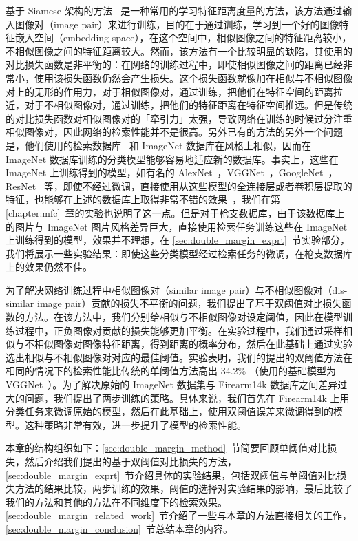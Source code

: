 基于 Siamese 架构的方法~\cite{Radenovic2016CNNIR,Chopra2005LearningAS,Bell2015LearningVS} 是一种常用的学习特征距离度量的方法，该方法通过输入图像对（image pair）来进行训练，目的在于通过训练，学习到一个好的图像特征嵌入空间（embedding space），在这个空间中，相似图像之间的特征距离较小，不相似图像之间的特征距离较大。然而，该方法有一个比较明显的缺陷，其使用的对比损失函数是非平衡的：在网络的训练过程中，即使相似图像之间的距离已经非常小，使用该损失函数仍然会产生损失。这个损失函数就像加在相似与不相似图像对上的无形的作用力，对于相似图像对，通过训练，把他们在特征空间的距离拉近，对于不相似图像对，通过训练，把他们的特征距离在特征空间推远。但是传统的对比损失函数对相似图像对的「牵引力」太强，导致网络在训练的时候过分注重相似图像对，因此网络的检索性能并不是很高。另外已有的方法的另外一个问题是，他们使用的检索数据库~\cite{Philbin2007ObjectRW,Philbin2008LostIQ} 和 ImageNet 数据库在风格上相似，因而在 ImageNet 数据库训练的分类模型能够容易地适应新的数据库。事实上，这些在 ImageNet 上训练得到的模型，如有名的 AlexNet~\cite{Krizhevsky2012ImageNetCW}，VGGNet~\cite{Simonyan2014VeryDC}，GoogleNet~\cite{Szegedy2015GoingDW}，ResNet~\cite{He2016DeepRL} 等，即使不经过微调，直接使用从这些模型的全连接层或者卷积层提取的特征，也能够在上述的数据库上取得非常不错的效果~\cite{Babenko2014NeuralCF,Babenko2015AggregatingLD,Tolias2015ParticularOR}，我们在第 \ref{chapter:mfc}~章的实验也说明了这一点。但是对于枪支数据库，由于该数据库上的图片与 ImageNet 图片风格差异巨大，直接使用检索任务训练这些在 ImageNet 上训练得到的模型，效果并不理想，在 \ref{sec:double_margin_exprt}~节实验部分，我们将展示一些实验结果：即使这些分类模型经过检索任务的微调，在枪支数据库上的效果仍然不佳。

为了解决网络训练过程中相似图像对（similar image pair）与不相似图像对（dis-similar image pair）贡献的损失不平衡的问题，我们提出了基于双阈值对比损失函数的方法。在该方法中，我们分别给相似与不相似图像对设定阈值，因此在模型训练过程中，正负图像对贡献的损失能够更加平衡。在实验过程中，我们通过采样相似与不相似图像对图像特征距离，得到距离的概率分布，然后在此基础上通过实验选出相似与不相似图像对对应的最佳阈值。实验表明，我们的提出的双阈值方法在相同的情况下的检索性能比传统的单阈值方法高出 34.2\% （使用的基础模型为 VGGNet~\cite{Simonyan2014VeryDC}）。为了解决原始的 ImageNet 数据集与 Firearm14k 数据库之间差异过大的问题，我们提出了两步训练的策略。具体来说，我们首先在 Firearm14k 上用分类任务来微调原始的模型，然后在此基础上，使用双阈值误差来微调得到的模型。这种策略非常有效，进一步提升了模型的检索性能。

本章的结构组织如下：\ref{sec:double_margin_method}~节简要回顾单阈值对比损失，然后介绍我们提出的基于双阈值对比损失的方法，\ref{sec:double_margin_exprt}~节介绍具体的实验结果，包括双阈值与单阈值对比损失方法的结果比较，两步训练的效果，阈值的选择对实验结果的影响，最后比较了我们的方法和其他的方法在不同维度下的检索效果。\ref{sec:double_margin_related_work}~节介绍了一些与本章的方法直接相关的工作，\ref{sec:double_margin_conclusion}~节总结本章的内容。

